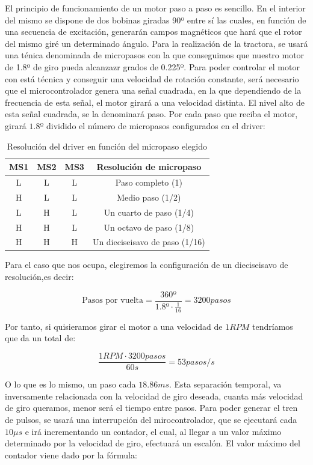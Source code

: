 El principio de funcionamiento de un motor paso a paso es sencillo. En el interior del mismo se dispone de dos bobinas giradas 90º entre sí \cite{pasoapaso} las cuales, en función de una secuencia de excitación, generarán campos magnéticos que hará que el rotor del mismo giré un determinado ángulo. Para la realización de la tractora, se usará una ténica denominada de micropasos con la que conseguimos que nuestro motor de 1.8º de giro pueda alcanzazr grados de 0.225º. Para poder controlar el motor con está técnica y conseguir una velocidad de rotación constante, será necesario que el microcontrolador genera una señal cuadrada, en la que dependiendo de la frecuencia de esta señal, el motor girará a una velocidad distinta. El nivel alto de esta señal cuadrada, se la denominará paso. Por cada paso que reciba el motor, girará $1.8º$ dividido el número de micropasos configurados en el driver:

\begin{table}[H]
\centering
\begin{tabular}{cccc}
{\bf MS1} & {\bf MS2} & {\bf MS3} & {\bf Resolución de micropaso}  \\
\hline
L         & L         & L         & Paso completo (1)              \\
H         & L         & L         & Medio paso (1/2)               \\
L         & H         & L         & Un cuarto de paso (1/4)        \\
H         & H         & L         & Un octavo de paso (1/8)        \\
H         & H         & H         & Un dieciseisavo de paso (1/16)
\end{tabular}
\caption{Resolución del driver en función del micropaso elegido}
\label{tab:res_drive}
\end{table}

Para el caso que nos ocupa, elegiremos la configuración de un dieciseisavo de resolución,es decir:

$$ \text{Pasos por vuelta} = \frac{360º}{1.8º \cdot \frac{1}{16}} = 3200 pasos  $$

Por tanto, si quisieramos girar el motor a una velocidad de $1RPM$ tendríamos que da un total de:

$$\frac{1 RPM \cdot 3200 pasos}{60 s} = 53 pasos/s$$

O lo que es lo mismo, un paso cada $18.86 ms$. Esta separación temporal, va inversamente relacionada con la velocidad de giro deseada, cuanta más velocidad de giro queramos, menor será el tiempo entre pasos. Para poder generar el tren de pulsos, se usará una interrupción del mirocontrolador, que se ejecutará cada $10\mu s$ e irá incrementando un contador, el cual, al llegar a un valor máximo determinado por la velocidad de giro, efectuará un escalón. El valor máximo del contador viene dado por la fórmula:

